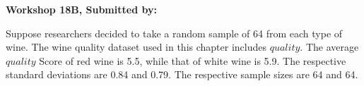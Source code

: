 \documentclass[11pt, chapterprefix=true]{scrbook}\usepackage[]{graphicx}\usepackage[]{color}
\begin{document}
\begin{exercises}
\begin{exercise}
\end{exercise} 
\begin{solution}  %


\end{solution}

\clearpage

    \begin{exercise}  %



    \begin{center}
\begin{flushleft}\textbf{\large \hfill Workshop 18B, Submitted by: }\end{flushleft}

\end{center}

Suppose researchers decided to take a random sample of 64 from each type of wine.  The wine quality dataset used in this chapter includes $quality$. The average $quality$ Score of red wine is 5.5, while that of white wine is 5.9. The respective standard deviations are 0.84 and 0.79. The respective sample sizes are 64 and 64.


\end{exercise}
\end{exercises}
\end{document}
